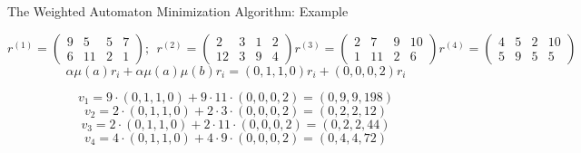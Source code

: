 \documentclass[rgb, pdf]{beamer}
\begin{document}
\begin{frame}[allowframebreaks]{The Weighted Automaton Minimization Algorithm: Example}
\begin{minipage}{0.3\textwidth}
\begin{center}
            \end{center}
            \end{minipage}
            
            \framebreak
            
            \[  r^{(1)}= \begin{pmatrix}
                        9 & 5 & 5 & 7 \\
                        6 & 11 & 2 & 1 
                    \end{pmatrix}; \ \
            r^{(2)}= \begin{pmatrix}
                        2 & 3 & 1 & 2 \\
                        12 & 3 & 9 & 4 
                    \end{pmatrix} 
            r^{(3)}= \begin{pmatrix}
                        2 & 7 & 9 & 10 \\
                        1 & 11 & 2 & 6 
                    \end{pmatrix}         
            r^{(4)}= \begin{pmatrix}
                        4 & 5 & 2 & 10 \\
                        5 & 9 & 5 & 5 
                    \end{pmatrix}                     
        \] \vspace{0.5cm}
        \[ \alpha\mu(a) r_i + \alpha \mu(a) \mu(b) r_i = (0,1,1,0) r_i + (0,0,0,2) r_i \]
        
        \begin{minipage}{0.58\textwidth}
         \[ v_1 = 9 \cdot (0,1,1,0) + 9 \cdot 11 \cdot (0,0,0,2) = (0,9,9,198) \]
        \[ v_2 = 2 \cdot (0,1,1,0) + 2 \cdot 3 \cdot (0,0,0,2) = (0,2,2,12) \]
        \[ v_3 = 2 \cdot (0,1,1,0) + 2 \cdot 11 \cdot (0,0,0,2) = (0,2,2,44) \]
        \[ v_4 = 4 \cdot (0,1,1,0) + 4 \cdot 9 \cdot (0,0,0,2) = (0,4,4,72) \]
        

\end{minipage}
\end{frame}
\end{document}
